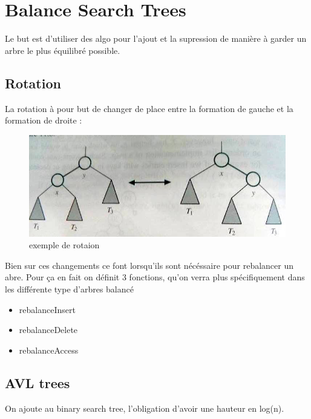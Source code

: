 \documentclass[a4paper]{article}
\begin{document}
\section{Balance Search Trees}
Le but est d'utiliser des algo pour l'ajout et la supression de manière à garder un arbre le plus équilibré possible.

\subsection{Rotation}
La rotation à pour but de changer de place entre la formation de gauche et la formation de droite :
\begin{figure}[!h]
\begin{center}
\includegraphics[scale=0.4]{rotation.jpg}
\caption{exemple de rotaion}
\end{center}
\end{figure}

Bien sur ces changements ce font lorsqu'ils sont nécéssaire pour rebalancer un abre. Pour ça en fait on définit 3 fonctions, qu'on verra plus spécifiquement dans les différente type d'arbres balancé
\begin{itemize}
\item rebalanceInsert
\item rebalanceDelete
\item rebalanceAccess
\end{itemize}

\subsection{AVL trees}
On ajoute au binary search tree, l'obligation d'avoir une hauteur en log(n).
\end{document}
